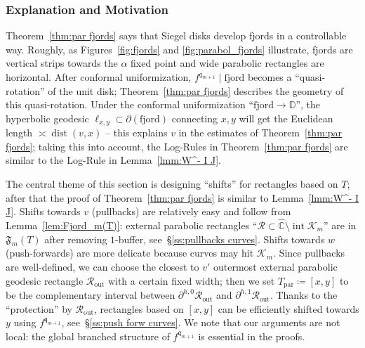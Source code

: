 \documentclass{amsart}
\newcommand{\1}{{\mathbb 1 }}
\newcommand{\reminder}[1]{\textsl{$\lhd\rhd$#1$\lhd\rhd$}\marginpar{$\lhd\rhd\lhd\rhd\lhd\rhd$}}
\newcommand\RR{\mathcal{R}}
\newcommand\intr{\operatorname{int}}
\newcommand{\qq}{\mathfrak{q}}
\newcommand\parab{{\operatorname{par}}}
\newcommand\out{{\operatorname{out}}}
\newcommand{\wC}{\widehat{\mathbb{C}}}
\newcommand{\Disk}{\mathbb{D}}
\theoremstyle{remark}
\numberwithin{equation}{section}
\theoremstyle{definition}
\newcommand{\filled}{{\mathcal {K} }}
\newcommand{\dist}{\operatorname{dist}}
\newcommand{\Fjord}{{\mathfrak F}}
\begin{document}
\subsubsection{Explanation and Motivation}
\label{sss:outline:s:par fjords} Theorem~\ref{thm:par fjords} says that Siegel disks develop fjords in a controllable way. Roughly, as Figures~\ref{fig:fjords}  and \ref{fig:parabol_fjords} illustrate, fjords are vertical strips towards the $\alpha$ fixed point and wide parabolic rectangles are horizontal. After conformal uniformization, $f^{q_{m+1}}\mid \text{fjord}$ becomes a ``quasi-rotation'' of the unit disk; Theorem~\ref{thm:par fjords} describes the geometry of this quasi-rotation. Under the conformal uniformization ``$\text{fjord}\to \Disk$'', the hyperbolic geodesic $\ell_{x,y}\subset \partial (\text{fjord})$ connecting $x,y$ will get the Euclidean length $\asymp \dist(v,x)$ -- this explains $v$ in the estimates of Theorem~\ref{thm:par fjords}; taking this into account, the Log-Rules in Theorem~\ref{thm:par fjords} are similar to the Log-Rule in Lemma~\ref{lmm:W^- I J}.



The central theme of this section is designing ``shifts'' for rectangles based on $T$; after that the proof of Theorem~\ref{thm:par fjords} is similar to Lemma~\ref{lmm:W^- I J}. Shifts towards $v$ (pullbacks) are relatively easy and follow from Lemma~\ref{lem:Fjord_m(T)}: external parabolic rectangles ``$\RR\subset \wC\setminus \intr \filled_m$'' are in $\Fjord_m(T)$ after removing $1$-buffer, see~\S\ref{ss:pullbacks curves}. Shifts towards $w$ (push-forwards) are more delicate because curves may hit $\filled_m$. Since pullbacks are well-defined, we can choose the closest to $v'$ outermost external parabolic geodesic rectangle $\RR_\out$ with a certain fixed width; then we set $T_\parab\coloneqq[x,y]$ to be the complementary interval between $\partial^{h,0}\RR_\out $ and $\partial^{h,1}\RR_\out$. Thanks to the ``protection'' by $\RR_\out $,  rectangles based on $[x,y]$ can be efficiently shifted towards $y$ using $f^{\qq_{m+1}}$, see~\S\ref{ss:push forw curves}. We note that our arguments are not local: the global branched structure of $f^{\qq_{m+1}}$ is essential in the proofs. %
\end{document}
